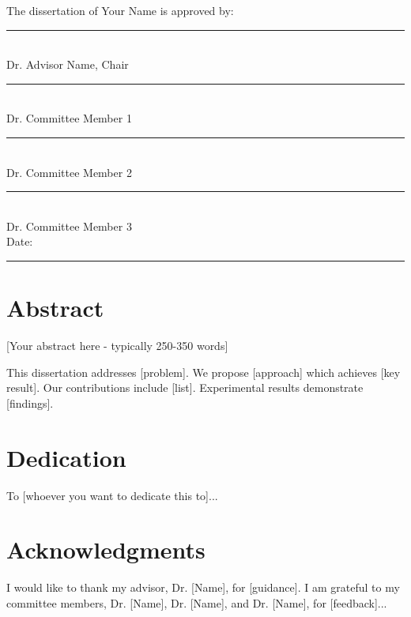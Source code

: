 \documentclass[12pt,oneside]{book}
\begin{document}
\newpage
\thispagestyle{empty}
\noindent
The dissertation of Your Name is approved by:\\

\vspace{1cm}
\noindent
\rule{10cm}{0.4pt}\\
Dr. Advisor Name, Chair\\

\vspace{1cm}
\noindent
\rule{10cm}{0.4pt}\\
Dr. Committee Member 1\\

\vspace{1cm}
\noindent
\rule{10cm}{0.4pt}\\
Dr. Committee Member 2\\

\vspace{1cm}
\noindent
\rule{10cm}{0.4pt}\\
Dr. Committee Member 3\\

\vspace{2cm}
\noindent
Date: \rule{5cm}{0.4pt}

\newpage
\chapter*{Abstract}

[Your abstract here - typically 250-350 words]

This dissertation addresses [problem]. We propose [approach] which achieves [key result]. Our contributions include [list]. Experimental results demonstrate [findings].

\newpage
\chapter*{Dedication}

To [whoever you want to dedicate this to]...

\newpage
\chapter*{Acknowledgments}

I would like to thank my advisor, Dr. [Name], for [guidance]. I am grateful to my committee members, Dr. [Name], Dr. [Name], and Dr. [Name], for [feedback]...
\end{document}
